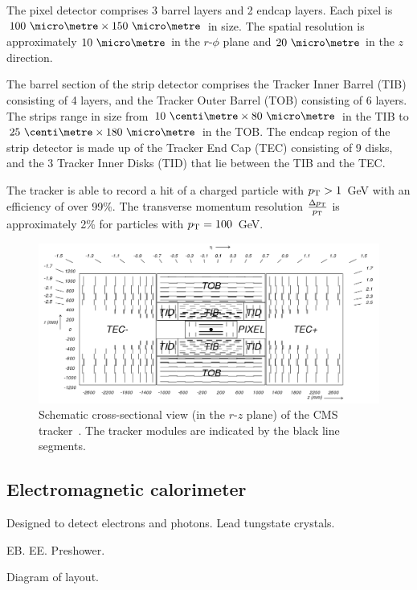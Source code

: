 The pixel detector comprises 3 barrel layers and 2 endcap layers. Each pixel is 
$100~\micro\metre\times150~\micro\metre$ in size. The spatial 
resolution is approximately $10~\micro\metre$ in the {$r$-$\phi$} plane and 
$20~\micro\metre$ in the $z$ direction.

The barrel section of the strip detector comprises the Tracker Inner Barrel 
(TIB) consisting of 4 layers, and the Tracker Outer Barrel (TOB) consisting of 
6 layers. The strips range in size from $10~\centi\metre\times80~\micro\metre$ 
in the TIB to $25~\centi\metre\times180~\micro\metre$ in the TOB. The endcap 
region of the strip detector is made up of the Tracker End Cap (TEC) consisting 
of 9 disks, and the 3 Tracker Inner Disks (TID) that lie between the TIB and 
the TEC.

The tracker is able to record a hit of a charged particle with ${p_{\text T}}>1$~GeV with 
an efficiency of over 99\%. The transverse momentum resolution 
$\frac{\Delta{p_{\text T}}}{{p_{\text T}}}$ is approximately 2\% for particles with ${p_{\text T}} = 100$~GeV.

\begin{figure}
\begin{center}
\includegraphics[width=0.8\linewidth]{figs/detector/tracker}
\end{center}
\caption{Schematic cross-sectional view (in the $r$-$z$ plane) of the CMS 
tracker~\cite{cms}. The tracker modules are indicated by the black line 
segments.}
\label{fig:tracker}
\end{figure}

\subsection{Electromagnetic calorimeter}

Designed to detect electrons and photons. Lead tungstate crystals.

EB. EE. Preshower.

Diagram of layout.

